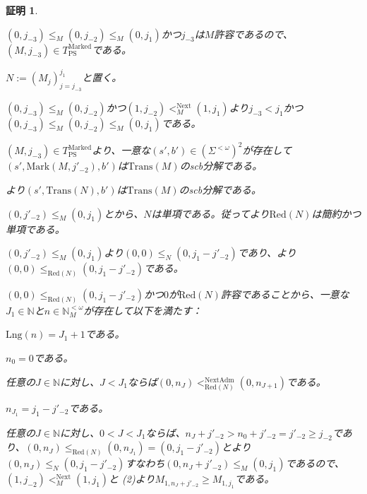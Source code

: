 \documentclass[dvipdfmx,uplatex]{jsarticle}
\theoremstyle{customnonumberbreakfortheorem}
\theoremstyle{customnonumberbreakforproof}
\newtheorem{hideableproof}{証明}
\begin{document}
\begin{hideableproof}
	\begin{indented}
		\item \((0,j_{-3}) \leq_M (0,j_{-2}) \leq_M (0,j_1)\)かつ\(j_{-3}\)は\(M\)許容であるので、\((M,j_{-3}) \in T_{\textrm{PS}}^{\textrm{Marked}}\)である。
		\item \(N := (M_j)_{j=j_{-3}}^{j_1}\)と置く。
		\item \((0,j_{-3}) \leq_M (0,j_{-2})\)かつ\((1,j_{-2}) <_M^{\textrm{Next}} (1,j_1)\)より\(j_{-3} < j_1\)かつ\((0,j_{-3}) \leq_M (0,j_{-2}) \leq_M (0,j_1)\)である。
		\begin{indented}
			\item \((M,j_{-3}) \in T_{\textrm{PS}}^{\textrm{Marked}}\)より、一意な\((s',b') \in (\Sigma^{< \omega})^2\)が存在して\((s',\textrm{Mark}(M,j'_{-2}),b')\)は\(\textrm{Trans}(M)\)のscb分解である。
			\item {}より\((s',\textrm{Trans}(N),b')\)は\(\textrm{Trans}(M)\)のscb分解である。
		\end{indented}
		\item
		\item \((0,j'_{-2}) \leq_M (0,j_1)\)とから、\(N\)は単項である。従ってより\(\textrm{Red}(N)\)は簡約かつ単項である。
		\item \((0,j'_{-2}) \leq_M (0,j_1)\)より\((0,0) \leq_N (0,j_1-j'_{-2})\)であり、より\((0,0) \leq_{\textrm{Red}(N)} (0,j_1-j'_{-2})\)である。
		\item \((0,0) \leq_{\textrm{Red}(N)} (0,j_1-j'_{-2})\)かつ\(0\)が\(\textrm{Red}(N)\)許容であることから、一意な\(J_1 \in \mathbb{N}\)と\(n \in \mathbb{N}_M^{< \omega}\)が存在して以下を満たす：
		\begin{indented}
			\item \(\textrm{Lng}(n) = J_1+1\)である。
			\item \(n_0 = 0\)である。
			\item 任意の\(J \in \mathbb{N}\)に対し、\(J < J_1\)ならば\((0,n_J) <_{\textrm{Red}(N)}^{\textrm{NextAdm}} (0,n_{J+1})\)である。
			\item \(n_{J_1} = j_1-j'_{-2}\)である。
		\end{indented}
		\item 任意の\(J \in \mathbb{N}\)に対し、\(0 < J < J_1\)ならば、\(n_J+j'_{-2} > n_0+j'_{-2} = j'_{-2} \geq j_{-2}\)であり、\((0,n_J) \leq_{\textrm{Red}(N)} (0,n_{J_1}) = (0,j_1-j'_{-2})\)とより\((0,n_J) \leq_N (0,j_1-j'_{-2})\)すなわち\((0,n_J+j'_{-2}) \leq_M (0,j_1)\)であるので、\((1,j_{-2}) <_M^{\textrm{Next}} (1,j_1)\)と (2)より\(M_{1,n_J+j'_{-2}} \geq M_{1,j_1}\)である。

\end{indented}
\end{hideableproof}
\end{document}
